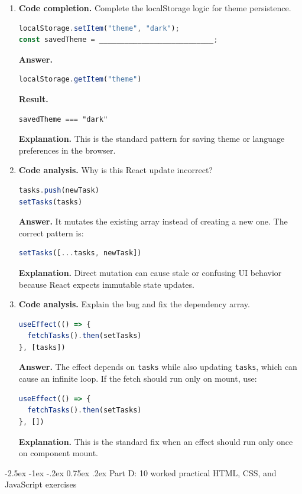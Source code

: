 \documentclass[11pt,a4paper]{article}
\makeatletter
\renewcommand\subsection{\@startsection{subsection}{2}{\z@}%
  {-2.5ex \@plus -1ex \@minus -.2ex}%
  {0.75ex \@plus .2ex}%
  {\normalfont\large\sffamily\bfseries\color{MidnightBlue}}}
\makeatother
\begin{document}
\begin{enumerate}
  \item \textbf{Code completion.} Complete the localStorage logic for theme persistence.
\begin{lstlisting}[style=code, language=JavaScript]
localStorage.setItem("theme", "dark");
const savedTheme = ___________________________;
\end{lstlisting}
\textbf{Answer.}
\begin{lstlisting}[style=code, language=JavaScript]
localStorage.getItem("theme")
\end{lstlisting}
\textbf{Result.}
\begin{lstlisting}[style=terminal]
savedTheme === "dark"
\end{lstlisting}
\textbf{Explanation.} This is the standard pattern for saving theme or language preferences in the browser.

  \item \textbf{Code analysis.} Why is this React update incorrect?
\begin{lstlisting}[style=code, language=JavaScript]
tasks.push(newTask)
setTasks(tasks)
\end{lstlisting}
\textbf{Answer.} It mutates the existing array instead of creating a new one. The correct pattern is:
\begin{lstlisting}[style=code, language=JavaScript]
setTasks([...tasks, newTask])
\end{lstlisting}
\textbf{Explanation.} Direct mutation can cause stale or confusing UI behavior because React expects immutable state updates.

  \item \textbf{Code analysis.} Explain the bug and fix the dependency array.
\begin{lstlisting}[style=code, language=JavaScript]
useEffect(() => {
  fetchTasks().then(setTasks)
}, [tasks])
\end{lstlisting}
\textbf{Answer.} The effect depends on \texttt{tasks} while also updating \texttt{tasks}, which can cause an infinite loop. If the fetch should run only on mount, use:
\begin{lstlisting}[style=code, language=JavaScript]
useEffect(() => {
  fetchTasks().then(setTasks)
}, [])
\end{lstlisting}
\textbf{Explanation.} This is the standard fix when an effect should run only once on component mount.
\end{enumerate}

\subsection{Part D: 10 worked practical HTML, CSS, and JavaScript exercises}
\end{document}
